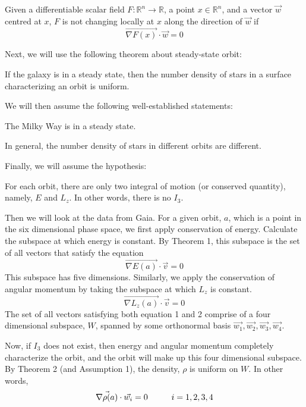 \documentclass[12pt]{article}
\begin{document}
\begin{theorem}
Given a differentiable scalar field $F: \mathbb{R}^n \to \mathbb{R}$, a point  $x \in \mathbb{R}^n$, and a vector $\vec{w}$ centred at $x$, $F$ is not changing locally at $x$ along the direction of $\vec{w}$ if 
$$ \vec{\nabla F(x)} \cdot \vec{w} = 0$$
\end{theorem}
Next, we will use the following theorem about steady-state orbit:
\begin{theorem}
If the galaxy is in a steady state, then the number density of stars in a surface characterizing an orbit is uniform.
\end{theorem}
We will then assume the following well-established statements:
\begin{assumption}
The Milky Way is in a steady state.
\end{assumption}
\begin{assumption}
In general, the number density of stars in different orbits are different.
\end{assumption}
Finally, we will assume the hypothesis:
\begin{hypothesis}
For each orbit, there are only two integral of motion (or conserved quantity), namely, $E$ and $L_z$. In other words, there is no $I_3$.
\end{hypothesis}

Then we will look at the data from Gaia. For a given orbit, $a$, which is a point in the six dimensional phase space, we first apply conservation of energy. Calculate the subspace at which energy is constant. By Theorem 1, this subspace is the set of all vectors that satisfy the equation
\begin{equation}
\vec{\nabla E(a)} \cdot \vec{v} = 0
\end{equation}  
This subspace has five dimensions. Similarly, we apply the conservation of angular momentum by taking the subspace at which $L_z$ is constant.
\begin{equation} 
\vec{\nabla L_z(a)} \cdot \vec{v} = 0 
\end{equation}
The set of all vectors satisfying both equation 1 and 2 comprise of a four dimensional subspace, $W$, spanned by some orthonormal basis $\vec{w_1},\vec{w_2},\vec{w_3},\vec{w_4} $.

Now, if $I_3$ does not exist, then energy and angular momentum completely characterize the orbit, and the orbit will make up this four dimensional subspace. By Theorem 2 (and Assumption 1), the density, $\rho$ is uniform on $W$. In other words,
\begin{equation}
\vec{\nabla \rho(a)} \cdot \vec{w_i} = 0 \hspace{1 cm} i = 1, 2, 3, 4 
\end{equation}
\end{document}
